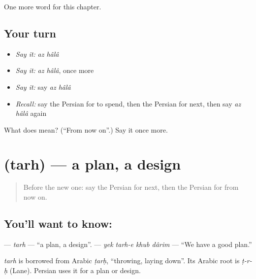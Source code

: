 \begin{grammarlens}[title={What you've built}]
One more word for this chapter.
\end{grammarlens}

\subsection*{Your turn}
\begin{itemize}
\raggedright
  \item \emph{Say it:} \emph{az hâlâ}
  \item \emph{Say it:} \emph{az hâlâ}, once more
  \item \emph{Say it:} say \emph{az hâlâ}
  \item \emph{Recall:} say the Persian for to spend, then the Persian for next, then say \emph{az hâlâ} again
\end{itemize}

\begin{tcolorbox}[breakable,colback=teal!4,colframe=teal!35!black,title={Before you move on}]
What does   mean? (\textquotedblleft{}From now on\textquotedblright{}.) Say it once more.
\end{tcolorbox}
\section[\texorpdfstring{\fa{طرح} (tarh)}{طرح (tarh)}]{ (tarh) — a plan, a design}

\label{lesson:FA-C138-tarh}



\begin{quote}
Before the new one: say the Persian for next, then the Persian for from now on.
\end{quote}

\subsection*{You'll want to know: }
\textbf{} — \emph{tarh} — \textquotedblleft{}a plan, a design\textquotedblright{}. \textbf{   } — \emph{yek tarh-e khub dârim} — \textquotedblleft{}We have a good plan.\textquotedblright{}

\begin{cousinweb}
\emph{tarh} is borrowed from Arabic \emph{ṭarḥ}, \textquotedblleft{}throwing, laying down\textquotedblright{}. Its Arabic root is \emph{ṭ-r-ḥ} (Lane). Persian uses it for a plan or design.
\end{cousinweb}

